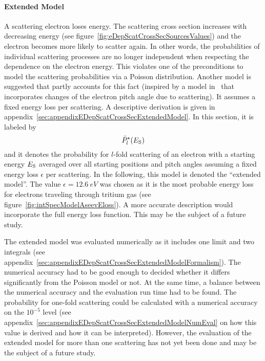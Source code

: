 \paragraph{Extended Model}
A scattering electron loses energy. The scattering cross section increases with decreasing energy (see figure~\ref{fig:eDepScatCrossSecSourcesValues}) and the electron becomes more likely to scatter again. In other words, the probabilities of individual scattering processes are no longer independent when respecting the dependence on the electron energy. This violates one of the preconditions to model the scattering probabilities via a Poisson distribution. Another model is suggested that partly accounts for this fact (inspired by a model in~\cite{Groh2015} that incorporates changes of the electron pitch angle due to scattering). It assumes a fixed energy loss per scattering. A descriptive derivation is given in appendix~\ref{sec:appendixEDepScatCrossSecExtendedModel}. In this section, it is labeled by
\begin{equation}
	\label{eq:eDepScatCrossSecModelExtended}
	\bar{P}^{\star}_l(E_\mathrm{S})
\end{equation}
and it denotes the probability for $l$-fold scattering of an electron with a starting energy $E_\mathrm{S}$ averaged over all starting positions and pitch angles assuming a fixed energy loss $\epsilon$ per scattering. In the following, this model is denoted the ``extended model''. The value $\epsilon=\SI{12.6}{eV}$ was chosen as it is the most probable energy loss for electrons traveling through tritium gas (see figure~\ref{fig:intSpecModelAseevEloss}). A more accurate description would incorporate the full energy loss function. This may be the subject of a future study. 

The extended model was evaluated numerically as it includes one limit and two integrals (see appendix~\ref{sec:appendixEDepScatCrossSecExtendedModelFormalism}). The numerical accuracy had to be good enough to decided whether it differs significantly from the Poisson model or not. At the same time, a balance between the numerical accuracy and the evaluation run time had to be found. The probability for one-fold scattering could be calculated with a numerical accuracy on the $10^{-5}$ level (see appendix~\ref{sec:appendixEDepScatCrossSecExtendedModelNumEval} on how this value is derived and how it can be interpreted). However, the evaluation of the extended model for more than one scattering has not yet been done and may be the subject of a future study.

